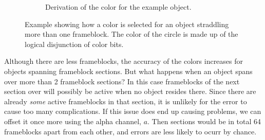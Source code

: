 \documentclass[conference]{IEEEtran}
\begin{document}
\begin{figure}[h!]
\begin{subfigure}{.5\textwidth}
\begin{center}
\begin{minipage}[t]{\linewidth}
\caption{Derivation of the color for the example object.}
\label{fig:object_color}
\end{minipage}
\end{center}
\end{subfigure}
\caption{Example showing how a color is selected for an object straddling more than one frameblock.
The color of the circle is made up of the logical disjunction of color bits.}
\label{fig:example}
\end{figure}

Although there are less frameblocks, the accuracy of the colors increases for objects spanning frameblock sections.
But what happens when an object spans over more than 2 frameblock sections?
In this case frameblocks of the next section over will possibly be active when no object resides there.
Since there are already \textit{some} active frameblocks in that section, it is unlikely for the error to cause
too many complications.
If this issue does end up causing problems, we can offset it once more using the alpha channel, $a$.
Then sections would be in total 64 frameblocks apart from each other, and errors are less likely to ocurr by chance.
\end{document}
